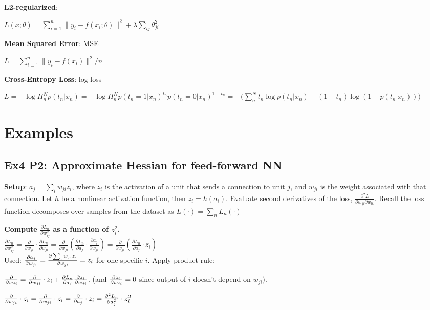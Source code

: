 \textbf{L2-regularized}:

\tab $L(x;\theta)=\sum^n_{i=1} \lVert y_i - f(x_i;\theta) \rVert^2 + \lambda\sum_{ij}\theta_{ji}^2$

\textbf{Mean Squared Error}: MSE

\tab $L=\sum^n_{i=1} \lVert y_i - f(x_i) \rVert^2 / n$

\textbf{Cross-Entropy Loss}: log loss

$L=-\log\Pi^N_n p(t_n|x_n)=-\log\Pi^N_n p(t_n=1|x_n)^{t_n} p(t_n=0|x_n)^{1-t_n}=-\bigr(\sum^N_n t_n \log p(t_n|x_n) + (1-t_n) \log (1-p(t_n|x_n))\bigr)$



\section*{Examples}
\subsection*{Ex4 P2: Approximate Hessian for feed-forward NN}
\textbf{Setup}: $a_j=\sum\limits_i w_{ji}z_i$, where $z_i$ is the activation of a unit that sends a connection to unit $j$, and $w_{ji}$ is the weight associated with that connection. Let $h$ be a nonlinear activation function, then $z_i=h(a_i)$. Evaluate second derivatives of the loss, $\frac{\partial^2 L}{\partial w_{ji} \partial w_{lk}}$. Recall the loss function decomposes over samples from the dataset as $L(\cdot)=\sum_n L_n(\cdot)$

\textbf{Compute $\frac{\partial L_n}{\partial w^2_{ij}}$ as a function of $z^2_i$.}\\

\tab$\frac{\partial L_n}{\partial w^2_{ij}}=\frac{\partial}{\partial w_{ji}}\cdot \frac{\partial L_n}{\partial w_{ji}}=\frac{\partial}{\partial w_{ji}}(\frac{\partial L_n}{\partial a_j}\cdot\frac{\partial a_j}{\partial w_{ji}})=\frac{\partial}{\partial w_{ji}}(\frac{\partial L_n}{\partial a_j}\cdot z_i)$\\

\tab Used: $\pdv{a_j}{w_{ji}}=\pdv{\sum_i w_{ji}z_i}{w_{ji}}=z_i$ for one specific $i$. Apply product rule:

\tab$\pdv{}{w_{ji}} (\pdv{L_n}{a_j}\cdot z_i)=\pdv{}{w_{ji}} (\pdv{L_n}{a_j})\cdot z_i+\pdv{L_n}{a_j}\pdv{z_i}{w_{ji}}$. (and $\pdv{z_i}{w_{ji}}=0$ since output of $i$ doesn't depend on $w_{ji}$).

\tab $\pdv{}{w_{ji}} ( \pdv{L_n}{a_j} )\cdot z_i=\pdv{}{w_{ji}} (\pdv{L_n}{w_{ji}})\cdot z_i=\pdv{}{a_j} (\pdv{L_n}{a_j}\pdv{a_j}{w_{ji}})\cdot z_i=\pdv[2]{L_n}{a_j}\cdot z_i^2$

